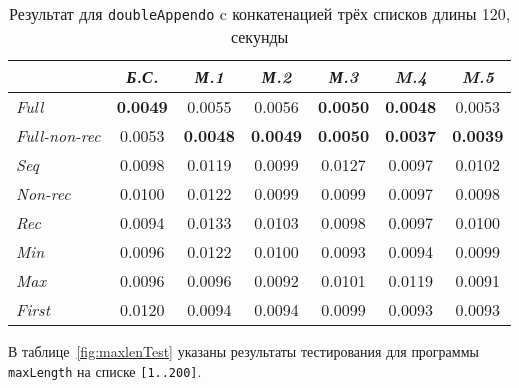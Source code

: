 \begin{table}[h!]
\center
\begin{tabular}{|l|c|c|c|c|c|c|}
\hline
                   &{\it Б.С.}&{\it М.1}&{\it М.2}&{\it М.3}&{\it M.4} & {\it M.5} \\ \hline
{\it Full        }& {\bf 0.0049}  & 0.0055       & 0.0056       & {\bf 0.0050} & {\bf 0.0048} & 0.0053\\ \hline
{\it Full-non-rec}& 0.0053        & {\bf 0.0048} & {\bf 0.0049} & {\bf 0.0050} & {\bf 0.0037} & {\bf 0.0039} \\ \hline
{\it Seq         }& 0.0098        & 0.0119       & 0.0099       & 0.0127       & 0.0097       & 0.0102 \\ \hline
{\it Non-rec     }& 0.0100        & 0.0122       & 0.0099       & 0.0099       & 0.0097       & 0.0098 \\ \hline
{\it Rec         }& 0.0094        & 0.0133       & 0.0103       & 0.0098       & 0.0097       & 0.0100 \\ \hline
{\it Min         }& 0.0096        & 0.0122       & 0.0100       & 0.0093       & 0.0094       & 0.0099 \\ \hline
{\it Max         }& 0.0096        & 0.0096       & 0.0092       & 0.0101       & 0.0119       & 0.0091 \\ \hline
{\it First       }& 0.0120        & 0.0094       & 0.0094       & 0.0099       & 0.0093       & 0.0093 \\ \hline

\end{tabular}
\caption{Результат для \lstinline{doubleAppendo} c конкатенацией трёх списков длины 120, секунды}
\label{fig:dappTest}
\end{table}

В таблице~\ref{fig:maxlenTest} указаны результаты тестирования для
программы \lstinline{maxLength} на списке \lstinline{[1..200]}.

